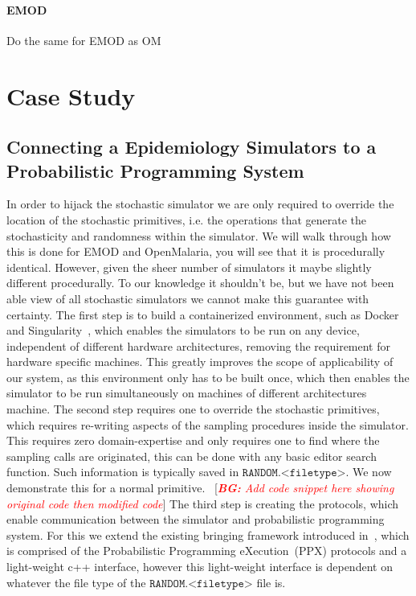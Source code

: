 \documentclass{article}
\newcommand{\bg}[1]{~{{[{\it \textcolor{red}{{\bf BG:} #1}}]}}}
\begin{document}
 \paragraph{EMOD} Do the same for EMOD as OM

\section{Case Study}
\label{sec:casestudy}
\subsection{Connecting a Epidemiology Simulators to a Probabilistic Programming System}

In order to hijack the stochastic simulator we are only required to override the location of the stochastic primitives, i.e. the operations that generate the stochasticity and randomness within the simulator. 
We will walk through how this is done for EMOD and OpenMalaria, you will see that it is procedurally identical.
However, given the sheer number of simulators it maybe slightly different procedurally. 
To our knowledge it shouldn't be, but we have not been able view of all stochastic simulators we cannot make this guarantee with certainty. 
The first step is to build a containerized environment, such as Docker~\cite{merkel2014docker} and Singularity~\cite{kurtzer2017singularity}, which enables the simulators to be run on any device, independent of different hardware architectures, removing the requirement for hardware specific machines. 
This greatly improves the scope of applicability of our system, as this environment only has to be built once, which then enables the simulator to be run simultaneously on machines of different architectures machine. 
The second step requires one to override the stochastic primitives, which requires re-writing aspects of the sampling procedures inside the simulator. 
This requires zero domain-expertise and only requires one to find where the sampling calls are originated, this can be done with any basic editor search function.
 Such information is typically saved in $\texttt{RANDOM.<filetype>}$.  We now demonstrate this for a normal primitive. 
\bg{Add code snippet here showing original code then modified code}
The third step is creating the protocols, which enable communication between the simulator and probabilistic programming system. 
For this we extend the existing bringing framework introduced in~\cite{baydin2018efficient}, which is comprised of the Probabilistic Programming eXecution~(PPX) protocols and a light-weight c++ interface, however this light-weight interface is dependent on whatever the file type of the $\texttt{RANDOM.<filetype>}$ file is.
\end{document}
